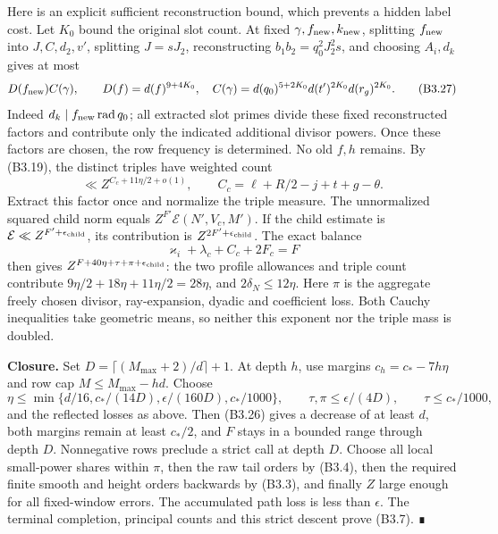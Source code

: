 \documentclass[11pt,a4paper]{article}
\begin{document}
Here is an explicit sufficient reconstruction bound, which prevents a
hidden label cost. Let \(K_0\) bound the original slot count. At fixed
\(\gamma,\allowbreak{}f_{\rm new},\allowbreak{}k_{\rm new}\), splitting \(f_{\rm new}\) into
\(J,\allowbreak{}C,\allowbreak{}d_2,\allowbreak{}v'\), splitting \(J=sJ_2\), reconstructing
\(b_1b_2=q_0^2J_2^2s\), and choosing \(A_i,\allowbreak{}d_k\) gives at most \[
D(f_{\rm new})C(\gamma),\qquad
D(f)=d(f)^{9+4K_0},\quad
C(\gamma)=d(q_0)^{5+2K_0}d(t')^{2K_0}d(r_g)^{2K_0}.
\tag{B3.27}
\] Indeed \(d_k\mid f_{\rm new}\operatorname{rad}q_0\); all extracted
slot primes divide these fixed reconstructed factors and contribute only
the indicated additional divisor powers. Once these factors are chosen,
the row frequency is determined. No old \(f,\allowbreak{}h\) remains. By (B3.19), the
distinct triples have weighted count \[
\ll Z^{C_c+11\eta/2+o(1)},\qquad
C_c=\ell+R/2-j+t+g-\theta.
\tag{B3.28}
\] Extract this factor once and normalize the triple measure. The
unnormalized squared child norm equals \(Z^{F'}\mathcal E(N',\allowbreak{}V_c,\allowbreak{}M')\).
If the child estimate is \(\mathcal E\ll Z^{F'+\epsilon_{\rm child}}\),
its contribution is \(Z^{2F'+\epsilon_{\rm child}}\). The exact balance
\[
\varkappa_i+\lambda_c+C_c+2F_c=F
\tag{B3.29}
\] then gives \(Z^{F+40\eta+\tau+\pi+\epsilon_{\rm child}}\): the two
profile allowances and triple count contribute
\(9\eta/2+18\eta+11\eta/2=28\eta\), and \(2\delta_N\le12\eta\). Here
\(\pi\) is the aggregate freely chosen divisor, ray-expansion, dyadic
and coefficient loss. Both Cauchy inequalities take geometric means, so
neither this exponent nor the triple mass is doubled.

\textbf{Closure.} Set \(D=\lceil(M_{\max}+2)/d\rceil+1\). At depth
\(h\), use margins \(c_h=c_*-7h\eta\) and row cap \(M\le M_{\max}-hd\).
Choose \[
\eta\le\min\{d/16,c_*/(14D),\epsilon/(160D),c_*/1000\},
\qquad\tau,\pi\le\epsilon/(4D),\qquad
\tau\le c_*/1000,
\tag{B3.30}
\] and the reflected losses as above. Then (B3.26) gives a decrease of
at least \(d\), both margins remain at least \(c_*/2\), and \(F\) stays
in a bounded range through depth \(D\). Nonnegative rows preclude a
strict call at depth \(D\). Choose all local small-power shares within
\(\pi\), then the raw tail orders by (B3.4), then the required finite
smooth and height orders backwards by (B3.3), and finally \(Z\) large
enough for all fixed-window errors. The accumulated path loss is less
than \(\epsilon\). The terminal completion, principal counts and this
strict descent prove (B3.7). ∎
\end{document}

